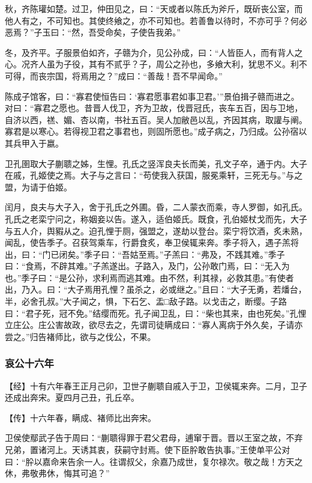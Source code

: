 \documentclass[]{article}
\begin{document}
秋，齐陈瓘如楚。过卫，仲田见之，曰：``天或者以陈氏为斧斤，既斫丧公室，而他人有之，不可知也。其使终飨之，亦不可知也。若善鲁以待时，不亦可乎？何必恶焉？''子玉曰：``然，吾受命矣，子使告我弟。''

冬，及齐平。子服景伯如齐，子赣为介，见公孙成，曰：``人皆臣人，而有背人之心。况齐人虽为子役，其有不贰乎？子，周公之孙也，多飨大利，犹思不义。利不可得，而丧宗国，将焉用之？''成曰：``善哉！吾不早闻命。''

陈成子馆客，曰：``寡君使恒告曰：`寡君愿事君如事卫君。'''景伯揖子赣而进之。对曰：``寡君之愿也。昔晋人伐卫，齐为卫故，伐晋冠氏，丧车五百，因与卫地，自济以西，禚、媚、杏以南，书社五百。吴人加敝邑以乱，齐因其病，取讙与阐。寡君是以寒心。若得视卫君之事君也，则固所愿也。''成子病之，乃归成。公孙宿以其兵甲入于嬴。

卫孔圉取大子蒯聩之姊，生悝。孔氏之竖浑良夫长而美，孔文子卒，通于内。大子在戚，孔姬使之焉。大子与之言曰：``苟使我入获国，服冕乘轩，三死无与。''与之盟，为请于伯姬。

闰月，良夫与大子入，舍于孔氏之外圃。昏，二人蒙衣而乘，寺人罗御，如孔氏。孔氏之老栾宁问之，称姻妾以告。遂入，适伯姬氏。既食，孔伯姬杖戈而先，大子与五人介，舆豭从之。迫孔悝于厕，强盟之，遂劫以登台。栾宁将饮酒，炙未熟，闻乱，使告季子。召获驾乘车，行爵食炙，奉卫侯辄来奔。季子将入，遇子羔将出，曰：``门已闭矣。''季子曰：``吾姑至焉。''子羔曰：``弗及，不践其难。''季子曰：``食焉，不辟其难。''子羔遂出。子路入，及门，公孙敢门焉，曰：``无入为也。''季子曰：``是公孙，求利焉而逃其难。由不然，利其禄，必救其患。''有使者出，乃入。曰：``大子焉用孔悝？虽杀之，必或继之。''且曰：``大子无勇，若燔台，半，必舍孔叔。''大子闻之，惧，下石乞、盂□敌子路。以戈击之，断缨。子路曰：``君子死，冠不免。''结缨而死。孔子闻卫乱，曰：``柴也其来，由也死矣。''孔悝立庄公。庄公害故政，欲尽去之，先谓司徒瞒成曰：``寡人离病于外久矣，子请亦尝之。''归告褚师比，欲与之伐公，不果。

\hypertarget{header-n3215}{%
\subsubsection{哀公十六年}\label{header-n3215}}

【经】十有六年春王正月己卯，卫世子蒯聩自戚入于卫，卫侯辄来奔。二月，卫子还成出奔宋。夏四月己丑，孔丘卒。

【传】十六年春，瞒成、褚师比出奔宋。

卫侯使鄢武子告于周曰：``蒯聩得罪于君父君母，逋窜于晋。晋以王室之故，不弃兄弟，置诸河上。天诱其衷，获嗣守封焉。使下臣肸敢告执事。''王使单平公对曰：``肸以嘉命来告余一人。往谓叔父，余嘉乃成世，复尔禄次。敬之哉！方天之休，弗敬弗休，悔其可追？''
\end{document}

